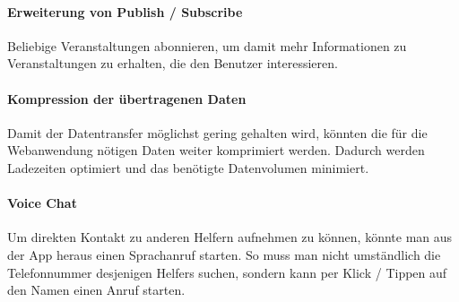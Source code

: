 \paragraph{Erweiterung von Publish / Subscribe}
Beliebige Veranstaltungen abonnieren, um damit mehr Informationen zu Veranstaltungen zu erhalten, die den Benutzer interessieren.

\paragraph{Kompression der übertragenen Daten}
Damit der Datentransfer möglichst gering gehalten wird, könnten die für die Webanwendung nötigen Daten weiter komprimiert werden. Dadurch werden Ladezeiten optimiert und das benötigte Datenvolumen minimiert.

\paragraph{Voice Chat}
Um direkten Kontakt zu anderen Helfern aufnehmen zu können, könnte man aus der App heraus einen Sprachanruf starten. So muss man nicht umständlich die Telefonnummer desjenigen Helfers suchen, sondern kann per Klick / Tippen auf den Namen einen Anruf starten.



